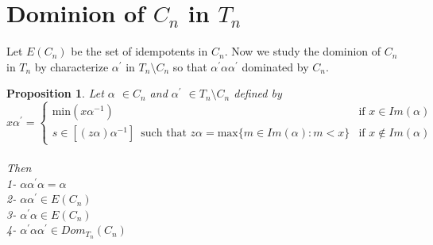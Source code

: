 \documentclass[10pt]{extarticle}
\numberwithin{equation}{section}
\numberwithin{bbb}{section}
\newtheorem{proposition}{Proposition}[section]
\numberwithin{equation}{section}
\begin{document}
\section{Dominion of $C_n$ in $T_n$}
\vspace{0.5cm}
Let $E(C_n)$ be the set of idempotents in $C_n$. Now we study the dominion of $C_n$ in $T_n$ by characterize $\alpha^{\prime}$ in $T_n \setminus C_n$ so that $\alpha^{\prime}\alpha\alpha^{\prime}$ dominated by $C_n$.
\vspace{0.2cm}
\begin{proposition}\label{coni}
Let $\alpha$ $\in C_n$ and $\alpha^{\prime}$ $\in T_n \setminus C_n$ defined by\\
 \begin{equation*}
 \tag{3}
    x\alpha^{\prime}= \begin{cases}
    \text{min} (x\alpha^{-1}) & \text{if } x \in Im(\alpha)\\
    s\in[(z\alpha)\alpha^{-1}] \,\,\,  \text{such that} \,\, z\alpha=\text{max} \{m\in Im(\alpha) : m<x\}  & \text{if } x \notin Im(\alpha)
    \end{cases}
\end{equation*}\\
Then \\ 
1- $\alpha\alpha^{\prime}\alpha=\alpha$\\
2- $\alpha \alpha^{\prime} \in E(C_n)$\\
3- $\alpha^{\prime}\alpha \in E(C_n)$\\
4- $\alpha^{\prime} \alpha \alpha^{\prime} \in Dom_{T_{n}}(C_n)$
\end{proposition}  
\end{document}
